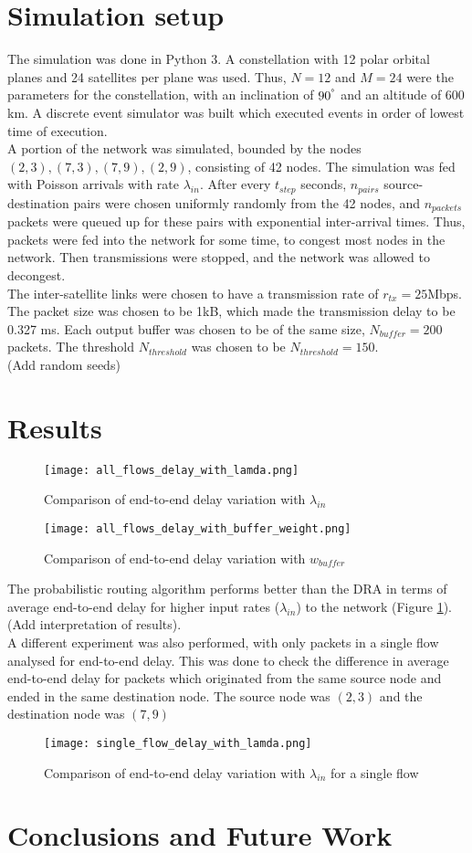 \documentclass[10pt,conference, draftcls, letterpaper]{IEEEtran}
\newcommand{\rough}[1]{{\color{red} #1}}
\begin{document}
\section{Simulation setup}
The simulation was done in Python 3. A constellation with 12 polar orbital planes and 24 satellites per plane was used. Thus, $N=12$ and $M=24$ were the parameters for the constellation, with an inclination of $90^\degree$ and an altitude of 600 km. A discrete event simulator was built which executed events in order of lowest time of execution. \\
A portion of the network was simulated, bounded by the nodes $(2,3), (7,3), (7,9), (2,9)$, consisting of 42 nodes. The simulation was fed with Poisson arrivals with rate $\lambda_{in}$. After every $t_{step}$ seconds, $n_{pairs}$ source-destination pairs were chosen uniformly randomly from the 42 nodes, and $n_{packets}$ packets were queued up for these pairs with exponential inter-arrival times. Thus, packets were fed into the network for some time, to congest most nodes in the network. Then transmissions were stopped, and the network was allowed to decongest. \\
The inter-satellite links were chosen to have a transmission rate of $r_{tx} = 25$Mbps. The packet size was chosen to be 1kB, which made the transmission delay to be 0.327 ms. Each output buffer was chosen to be of the same size, $N_{buffer} = 200$ packets. The threshold $N_{threshold}$ was chosen to be $N_{threshold} = 150$. \\
\rough{(Add random seeds)}
\section{Results}
\begin{figure}
	\texttt{[image: all\_flows\_delay\_with\_lamda.png]}
	\caption{Comparison of end-to-end delay variation with $\lambda_{in}$}
	\label{fig:lamda_var}
\end{figure}
\begin{figure}
	\texttt{[image: all\_flows\_delay\_with\_buffer\_weight.png]}
	\caption{Comparison of end-to-end delay variation with $w_{buffer}$}
	\label{fig:buffer_weight_var}
\end{figure}
The probabilistic routing algorithm performs better than the DRA in terms of average end-to-end delay for higher input rates ($\lambda_{in}$) to the network (Figure \ref{fig:lamda_var}). \rough{(Add interpretation of results)}.\\
A different experiment was also performed, with only packets in a single flow analysed for end-to-end delay. This was done to check the difference in average end-to-end delay for packets which originated from the same source node and ended in the same destination node. The source node was $(2,3)$ and the destination node was $(7,9)$\\
\begin{figure}
	\texttt{[image: single\_flow\_delay\_with\_lamda.png]}
	\caption{Comparison of end-to-end delay variation with $\lambda_{in}$ for a single flow}
	\label{fig:single_lamda_var}
\end{figure} 
\section{Conclusions and Future Work}


\end{document}
